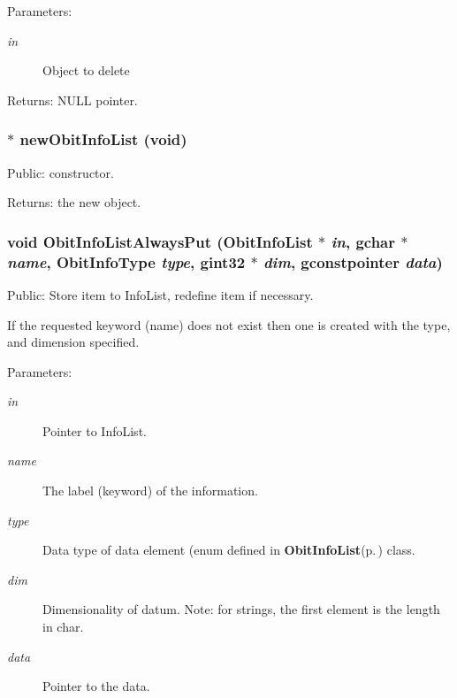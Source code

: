 \begin{Desc}
\item[Parameters:]
\begin{description}
\item[{\em in}]Object to delete \end{description}
\end{Desc}
\begin{Desc}
\item[Returns:]NULL pointer. \end{Desc}
\subsubsection{$\ast$ new\-Obit\-Info\-List (void)}\label{ObitInfoList_8c_a2}


Public: constructor. 

\begin{Desc}
\item[Returns:]the new object. \end{Desc}
\subsubsection{\setlength{\rightskip}{0pt plus 5cm}void Obit\-Info\-List\-Always\-Put ({\bf Obit\-Info\-List} $\ast$ {\em in}, gchar $\ast$ {\em name}, Obit\-Info\-Type {\em type}, gint32 $\ast$ {\em dim}, gconstpointer {\em data})}\label{ObitInfoList_8c_a13}


Public: Store item to Info\-List, redefine item if necessary. 

If the requested keyword (name) does not exist then one is created with the type, and dimension specified. \begin{Desc}
\item[Parameters:]
\begin{description}
\item[{\em in}]Pointer to Info\-List. \item[{\em name}]The label (keyword) of the information. \item[{\em type}]Data type of data element (enum defined in {\bf Obit\-Info\-List}{\rm (p.\,\pageref{structObitInfoList})} class. \item[{\em dim}]Dimensionality of datum. Note: for strings, the first element is the length in char. \item[{\em data}]Pointer to the data. \end{description}
\end{Desc}
